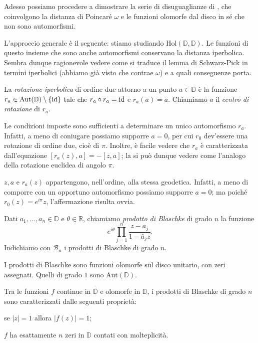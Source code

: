 Adesso possiamo procedere a dimostrare la serie di disuguaglianze di \cite{BM}, che coinvolgono la distanza di Poincaré $\omega$ e le funzioni olomorfe dal disco in sé che non sono automorfismi.

L'approccio generale è il seguente: stiamo studiando $\text{Hol}(\mathbb{D},\mathbb{D})$. Le funzioni di questo insieme che sono anche automorfismi conservano la distanza iperbolica. Sembra dunque ragionevole vedere come si traduce il lemma di Schwarz-Pick in termini iperbolici (abbiamo già visto che contrae $\omega$) e a quali conseguenze porta.

\begin{defn}
  La \textit{rotazione iperbolica} di ordine due attorno a un punto $a \in \mathbb{D}$ è la funzione $r_a \in \text{Aut}(\mathbb{D})\setminus\{\operatorname{id}\}$ tale che $r_a \circ r_a=\operatorname{id}$ e $r_a(a)=a$.
  Chiamiamo $a$ il \textit{centro di rotazione} di $r_a$.
\end{defn}

\begin{oss}
  Le condizioni imposte sono sufficienti a determinare un unico automorfismo $r_a$. Infatti, a meno di coniugare possiamo supporre $a=0$, per cui $r_0$ dev'essere una rotazione di ordine due, cioè di $\pi$. Inoltre, è facile vedere che $r_a$ è caratterizzata dall'equazione $[r_a(z),a]=-[z,a]$; la si può dunque vedere come l'analogo della rotazione euclidea di angolo $\pi$.
\end{oss}

\begin{oss} \label{rotegeo}
  $z, a$ e $r_a(z)$ appartengono, nell'ordine, alla stessa geodetica. Infatti, a meno di comporre con un opportuno automorfismo possiamo supporre $a=0$; ma poiché $r_0(z)=e^{i\pi}z$, l'affermazione risulta ovvia.
\end{oss}

\begin{defn}
  Dati $a_1,\dots,a_n \in \mathbb{D}$ e $\theta \in \mathbb{R}$, chiamiamo \textit{prodotto di Blaschke} di grado $n$ la funzione
  $$e^{i\theta}\prod_{j=1}^n \frac{z-a_j}{1-\bar{a}_jz}.$$
  Indichiamo con $\mathcal{B}_n$ i prodotti di Blaschke di grado $n$.
\end{defn}

\begin{oss}
  I prodotti di Blaschke sono funzioni olomorfe sul disco unitario, con zeri assegnati. Quelli di grado $1$ sono $\text{Aut}(\mathbb{D})$.
\end{oss}

\begin{lm} \label{Blaschke-car}
  Tra le funzioni $f$ continue in $\overline{\mathbb{D}}$ e olomorfe in $\mathbb{D}$, i prodotti di Blaschke di grado $n$ sono caratterizzati dalle seguenti proprietà:
  \begin{nlist}
    \item se $|z|=1$ allora $|f(z)|=1$;
    \item $f$ ha esattamente $n$ zeri in $\mathbb{D}$ contati con molteplicità.
  \end{nlist}
\end{lm}

